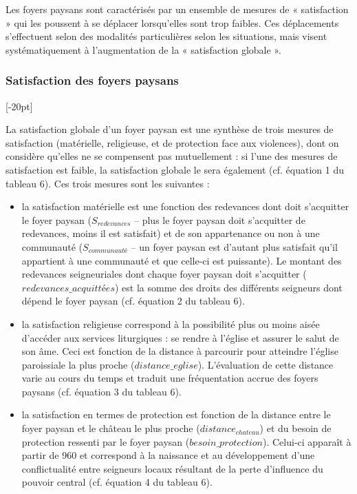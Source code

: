 Les foyers paysans sont caractérisés par un ensemble de mesures de « satisfaction » qui les poussent à se déplacer lorsqu'elles sont trop faibles.
Ces déplacements s'effectuent selon des modalités particulières selon les situations, mais visent systématiquement à l'augmentation de la « satisfaction globale ».

\clearpage
\subsubsection{Satisfaction des foyers paysans}[-20pt]

La satisfaction globale d'un foyer paysan est une synthèse de trois mesures de satisfaction (matérielle, religieuse, et de protection face aux violences), dont on considère qu'elles ne se compensent pas mutuellement :
si l'une des mesures de satisfaction est faible, la satisfaction globale le sera également (cf. équation 1 du tableau 6).
Ces trois mesures sont les suivantes :
\begin{itemize}
	\item la satisfaction matérielle est une fonction des redevances dont doit s'acquitter le foyer paysan ($S_{redevances}$ – plus le foyer paysan doit s'acquitter de redevances, moins il est satisfait) et de son appartenance ou non à une communauté ($S_{communauté}$ – un foyer paysan est d'autant plus satisfait qu'il appartient à une communauté et que celle-ci est puissante).
	Le montant des redevances seigneuriales dont chaque foyer paysan doit s'acquitter ($redevances\_acquittées$) est la somme des droits des différents seigneurs dont dépend le foyer paysan (cf. équation 2 du tableau 6).
	
	\item la satisfaction religieuse correspond à la possibilité plus ou moins aisée d'accéder aux services liturgiques :
	se rendre à l'église et assurer le salut de son âme.
	Ceci est fonction de la distance à parcourir pour atteindre l'église paroissiale la plus proche ($distance\_eglise$).
	L'évaluation de cette distance varie au cours du temps et traduit une fréquentation accrue des foyers paysans (cf. équation 3 du tableau 6).
	
	\item la satisfaction en termes de protection est fonction de la distance entre le foyer paysan et le château le plus proche ($distance_{chateau}$) et du besoin de protection ressenti par le foyer paysan ($besoin\_protection$).
	Celui-ci apparaît à partir de 960 et correspond à la naissance et au développement d'une conflictualité entre seigneurs locaux résultant de la perte d'influence du pouvoir central (cf. équation 4 du tableau 6).
\end{itemize}

